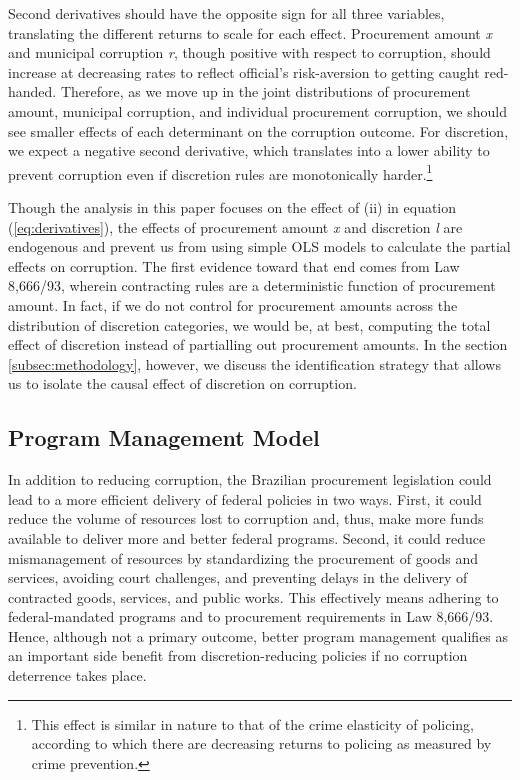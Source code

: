 \documentclass[11pt]{article}
\begin{document}
Second derivatives should have the opposite sign for all three variables, translating the different returns to scale for each effect. Procurement amount \emph{x} and municipal corruption \emph{r}, though positive with respect to corruption, should increase at decreasing rates to reflect official's risk-aversion to getting caught red-handed. Therefore, as we move up in the joint distributions of procurement amount, municipal corruption, and individual procurement corruption, we should see smaller effects of each determinant on the corruption outcome. For discretion, we expect a negative second derivative, which translates into a lower ability to prevent corruption even if discretion rules are monotonically harder.\footnote{This effect is similar in nature to that of the crime elasticity of policing, according to which there are decreasing returns to policing as measured by crime prevention.}

Though the analysis in this paper focuses on the effect of (ii) in equation (\ref{eq:derivatives}), the effects of procurement amount \emph{x} and discretion \emph{l} are endogenous and prevent us from using simple OLS models to calculate the partial effects on corruption. The first evidence toward that end comes from Law 8,666/93, wherein contracting rules are a deterministic function of procurement amount. In fact, if we do not control for procurement amounts across the distribution of discretion categories, we would be, at best, computing the total effect of discretion instead of partialling out procurement amounts. In the section \ref{subsec:methodology}, however, we discuss the identification strategy that allows us to isolate the causal effect of discretion on corruption.

\subsection{Program Management Model} \label{subsec:mismanagement}

In addition to reducing corruption, the Brazilian procurement legislation could lead to a more efficient delivery of federal policies in two ways. First, it could reduce the volume of resources lost to corruption and, thus, make more funds available to deliver more and better federal programs. Second, it could reduce mismanagement of resources by standardizing the procurement of goods and services, avoiding court challenges, and preventing delays in the delivery of contracted goods, services, and public works. This effectively means adhering to federal-mandated programs and to procurement requirements in Law 8,666/93. Hence, although not a primary outcome, better program management qualifies as an important side benefit from discretion-reducing policies if no corruption deterrence takes place.
\end{document}
